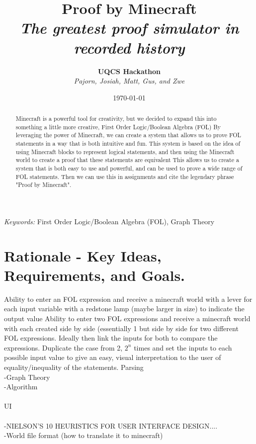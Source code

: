 \documentclass[11pt]{diazessay} %
\title{\textbf{Proof by Minecraft} \\ {\Large\itshape The greatest proof simulator in recorded history}} %
\author{\textbf{UQCS Hackathon} \\ \textit{Pajorn, Josiah, Matt, Gus, and Zwe}} %
\date{\today} %
\begin{document}
\maketitle %



\begin{abstract}
Minecraft is a powerful tool for creativity, but we decided to expand this into something a little more creative, First Order Logic/Boolean Algebra (FOL)
By leveraging the power of Minecraft, we can create a system that allows us to prove FOL statements in a way that is both intuitive and fun.
This system is based on the idea of using Minecraft blocks to represent logical statements, and then using the Minecraft world to create a proof that these statements are equivalent
This allows us to create a system that is both easy to use and powerful, and can be used to prove a wide range of FOL statements.
Then we can use this in assignments and cite the legendary phrase "Proof by Minecraft".
\end{abstract}

\hspace*{3.6mm}\textit{Keywords:} First Order Logic/Boolean Algebra (FOL), Graph Theory %

\vspace{30pt} %


\section*{Rationale - Key Ideas, Requirements, and Goals.}

Ability to enter an FOL expression and receive a minecraft world with a lever for each input variable with a redstone lamp (maybe larger in size) to indicate the output value
Ability to enter two FOL expressions and receive a minecraft world with each created side by side (essentially 1 but side by side for two different FOL expressions. Ideally then link the inputs for both to compare the expressions.
Duplicate the case from 2, $2^n$ times and set the inputs to each possible input value to give an easy, visual interpretation to the user of equality/inequality of the statements.
Parsing\\
-Graph Theory\\
-Algorithm\\
\\
UI\\
\\-NIELSON'S 10 HEURISTICS FOR USER INTERFACE DESIGN....
\\-World file format (how to translate it to minecraft)
\end{document}
